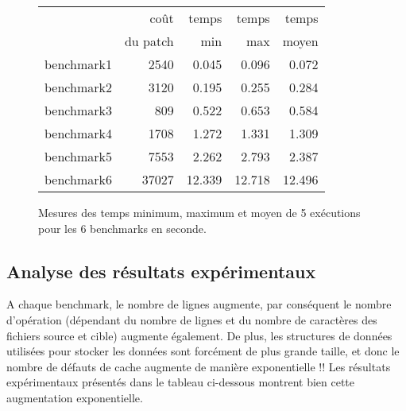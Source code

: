 \documentclass[a4paper, 10pt, french]{article}
\begin{document}
    \begin{figure}[h]
      \begin{center}
        \begin{tabular}{|l||r||r|r|r||}
          \hline
          \hline
            & coût         & temps     & temps   & temps \\
            & du patch     & min       & max     & moyen \\
          \hline
          \hline
            benchmark1 &  2540    &  0.045   & 0.096    & 0.072    \\
          \hline
            benchmark2 &    3120  &   0.195  & 0.255    & 0.284    \\
          \hline
            benchmark3 &     809 &  0.522   &  0.653   &  0.584   \\
          \hline
            benchmark4 &    1708  &   1.272  & 1.331    &  1.309   \\
          \hline
            benchmark5 &    7553  &   2.262  & 2.793    &  2.387   \\
          \hline
            benchmark6 &    37027  &  12.339   &  12.718   & 12.496    \\
          \hline
          \hline
        \end{tabular}
        \caption{Mesures des temps minimum, maximum et moyen de 5 exécutions pour les 6 benchmarks en seconde.}
        \label{table-temps}
      \end{center}
    \end{figure}

\subsection{Analyse des résultats expérimentaux}
A chaque benchmark, le nombre de lignes augmente, par conséquent le nombre d'opération (dépendant du nombre de lignes et du nombre de caractères des fichiers source et cible) augmente également. De plus, les structures de données utilisées pour stocker les données sont forcément de plus grande taille, et donc le nombre de défauts de cache augmente de manière exponentielle !! 
Les résultats expérimentaux présentés dans le tableau ci-dessous montrent bien cette augmentation exponentielle. 
\end{document}
